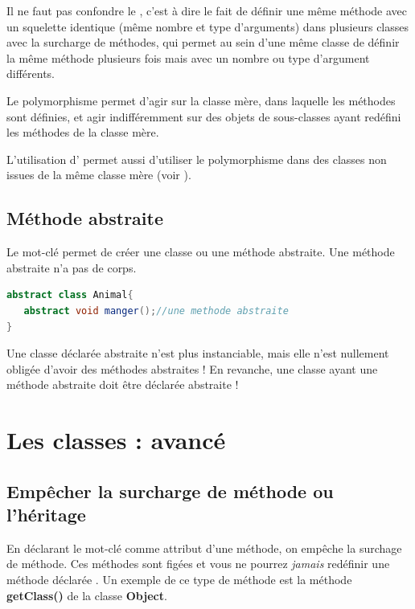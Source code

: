 \documentclass[a4paper,twoside]{article}
\begin{document}
\begin{attention}
Il ne faut pas confondre le , c'est à dire le fait de définir une même méthode avec un squelette identique (même nombre et type d'arguments) dans plusieurs classes avec la surcharge de méthodes, qui permet au sein d'une même classe de définir la même méthode plusieurs fois mais avec un nombre ou type d'argument différents.
\end{attention}

Le polymorphisme permet d'agir sur la classe mère, dans laquelle les méthodes sont définies, et agir indifféremment sur des objets de sous-classes ayant redéfini les méthodes de la classe mère. 

\begin{remarque}
L'utilisation d' permet aussi d'utiliser le polymorphisme dans des classes non issues de la même classe mère (voir ).
\end{remarque}

\subsection{Méthode abstraite}\label{sec:methode_abstraite}
Le mot-clé  permet de créer une classe ou une méthode abstraite. Une méthode abstraite n'a pas de corps.

\begin{lstlisting}[language=java]
abstract class Animal{
   abstract void manger();//une methode abstraite
}
\end{lstlisting}

\begin{remarque}
Une classe déclarée abstraite n'est plus instanciable, mais elle n'est nullement obligée d'avoir des méthodes abstraites ! En revanche, une classe ayant une méthode abstraite doit être déclarée abstraite ! 
\end{remarque}

\section{Les classes : avancé}
\subsection{Empêcher la surcharge de méthode ou l'héritage}\label{sec:empecher_heritage}
En déclarant le mot-clé  comme attribut d'une méthode, on empêche la surchage de méthode. Ces méthodes sont figées et vous ne pourrez \textit{jamais} redéfinir une méthode déclarée . Un exemple de ce type de méthode est la méthode \textbf{getClass()} de la classe \textbf{Object}.
\end{document}
